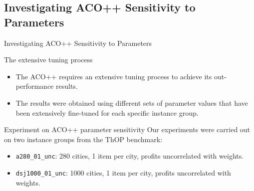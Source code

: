 \documentclass[aspectratio=169]{beamer}
\begin{document}


\subsection{Investigating ACO++ Sensitivity to Parameters}
\begin{frame}{Investigating ACO++ Sensitivity to Parameters}
    \begin{block}{The extensive tuning process}
        \begin{itemize}
            \justifying
            \item The ACO++ requires an extensive tuning process to achieve its out-performance results.
            \item The results were obtained using different sets of parameter values that have been extensively fine-tuned for each specific instance group.
        \end{itemize}
        \vspace{0.1cm}
    \end{block}

    \begin{block}{Experiment on ACO++ parameter sensitivity}
        \justifying
        Our experiments were carried out on two instance groups from the ThOP benchmark:
        \begin{itemize}
            \item \texttt{a280\_01\_unc}: 280 cities, 1 item per city, profits uncorrelated with weights.
            \item \texttt{dsj1000\_01\_unc}: 1000 cities, 1 item per city, profits uncorrelated with weights.
        \end{itemize}
        \vspace{0.1cm}
    \end{block}

\end{frame}
\end{document}
